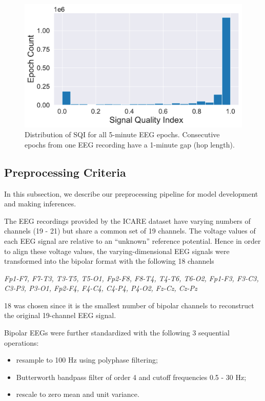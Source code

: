 \begin{figure}[!htp]
\centering
\includegraphics[width=\linewidth]{images/sqi-stats.pdf}
\caption[]{Distribution of SQI for all 5-minute EEG epochs. Consecutive epochs from one EEG recording have a 1-minute gap (hop length).}
\label{fig:sqi-stats}
\end{figure}


\subsection{Preprocessing Criteria}
\label{subsec:data_preproc}

In this subsection, we describe our preprocessing pipeline for model development and making inferences.

The EEG recordings provided by the ICARE dataset have varying numbers of channels (19 - 21) but share a common set of 19 channels. The voltage values of each EEG signal are relative to an ``unknown'' reference potential. Hence in order to align these voltage values, the varying-dimensional EEG signals were transformed into the bipolar format with the following 18 channels
\begin{indentedquote}{0.3in}
\it Fp1-F7, F7-T3, T3-T5, T5-O1, Fp2-F8, F8-T4, T4-T6, T6-O2, Fp1-F3, F3-C3, C3-P3, P3-O1, Fp2-F4, F4-C4, C4-P4, P4-O2, Fz-Cz, Cz-Pz
\end{indentedquote}
18 was chosen since it is the smallest number of bipolar channels to reconstruct the original 19-channel EEG signal.

Bipolar EEGs were further standardized with the following 3 sequential operations:
\begin{itemize}
    \item resample to 100 Hz using polyphase filtering;
    \item Butterworth bandpass filter of order 4 and cutoff frequencies 0.5 - 30 Hz;
    \item rescale to zero mean and unit variance.
\end{itemize}


